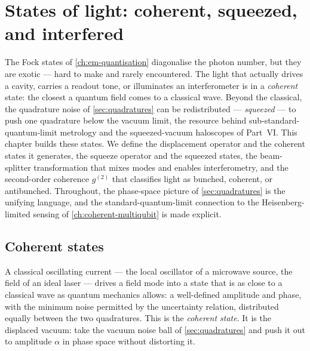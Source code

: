 \chapter{States of light: coherent, squeezed, and interfered}
\label{ch:states-of-light}

The Fock states of \cref{ch:em-quantisation} diagonalise the photon
number, but they are exotic --- hard to make and rarely encountered.
The light that actually drives a cavity, carries a readout tone, or
illuminates an interferometer is in a \emph{coherent} state: the
closest a quantum field comes to a classical wave. Beyond the
classical, the quadrature noise of \cref{sec:quadratures} can be
redistributed --- \emph{squeezed} --- to push one quadrature below
the vacuum limit, the resource behind sub-standard-quantum-limit
metrology and the squeezed-vacuum haloscopes of Part~VI. This
chapter builds these states. We define the displacement operator
and the coherent states it generates, the squeeze operator and the
squeezed states, the beam-splitter transformation that mixes modes
and enables interferometry, and the second-order coherence
$g^{(2)}$ that classifies light as bunched, coherent, or
antibunched. Throughout, the phase-space picture of
\cref{sec:quadratures} is the unifying language, and the
standard-quantum-limit connection to the Heisenberg-limited sensing
of \cref{ch:coherent-multiqubit} is made explicit.

\section{Coherent states}
\label{sec:coherent-states}

\begin{phenomenon}
A classical oscillating current --- the local oscillator of a
microwave source, the field of an ideal laser --- drives a field
mode into a state that is as close to a classical wave as quantum
mechanics allows: a well-defined amplitude and phase, with the
minimum noise permitted by the uncertainty relation, distributed
equally between the two quadratures. This is the \emph{coherent
state}. It is the displaced vacuum: take the vacuum noise ball of
\cref{sec:quadratures} and push it out to amplitude $\alpha$ in
phase space without distorting it.
\end{phenomenon}

